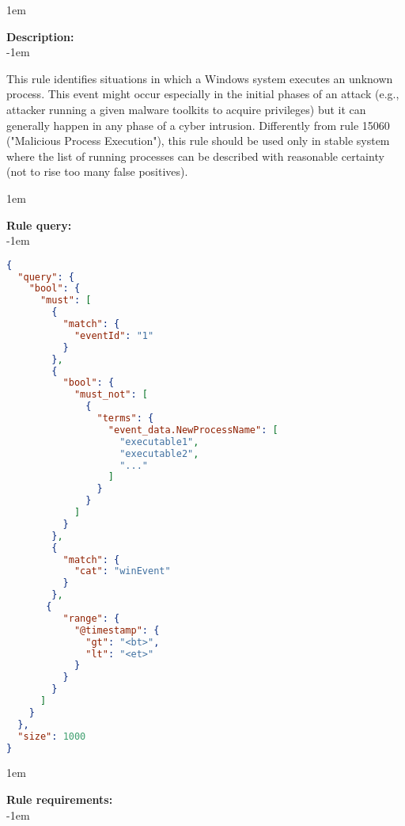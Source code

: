 \openup 1em

{\bf Description:} \\

\openup -1em
\vspace{-2em}


This rule identifies situations in which a Windows system executes an unknown process. This event might occur especially in the initial phases of an attack (e.g., attacker running a given malware toolkits to acquire privileges) but it can generally happen in any phase of a cyber intrusion. Differently from rule 15060 ("Malicious Process Execution"), this rule should be used only in stable system where the list of running processes can be described with reasonable certainty (not to rise too many false positives).

\openup 1em

{\bf Rule query:} \\

\openup -1em
\vspace{-2em}

\begin{lstlisting}[language=json,firstnumber=1]
{
  "query": {
    "bool": {
      "must": [
        {
          "match": {
            "eventId": "1"
          }
        },
        {
          "bool": {
            "must_not": [
              {
                "terms": {
                  "event_data.NewProcessName": [
                    "executable1",
                    "executable2",
                    "..."
                  ]
                }
              }
            ]
          }
        },
        {
          "match": {
            "cat": "winEvent"
          }
        },
       {
          "range": {
            "@timestamp": {
              "gt": "<bt>",
              "lt": "<et>"
            }
          }
        }
      ]
    }
  },
  "size": 1000
}
\end{lstlisting}

\openup 1em

{\bf Rule requirements:} \\

\openup -1em
\vspace{-2em}

